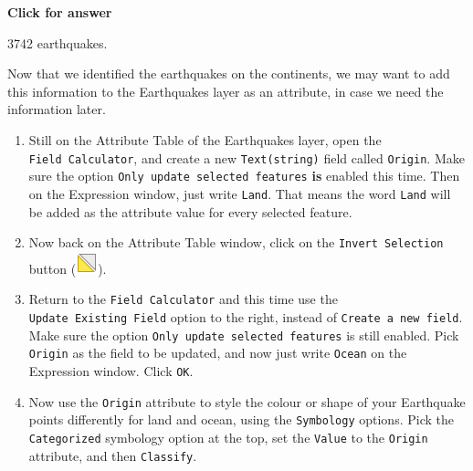 \documentclass[
  letterpaper,
  DIV=11,
  numbers=noendperiod]{scrreprt}
\begin{document}
\begin{tcolorbox}[enhanced jigsaw, toprule=.15mm, breakable, left=2mm, colframe=quarto-callout-important-color-frame, colback=white, arc=.35mm, leftrule=.75mm, opacityback=0, rightrule=.15mm, bottomrule=.15mm]

\vspace{-3mm}\textbf{Click for answer}\vspace{3mm}

3742 earthquakes.

\end{tcolorbox}

Now that we identified the earthquakes on the continents, we may want to
add this information to the Earthquakes layer as an attribute, in case
we need the information later.

\begin{enumerate}
\def\labelenumi{(\arabic{enumi})}
\setcounter{enumi}{106}
\item
  Still on the Attribute Table of the Earthquakes layer, open the
  \texttt{Field\ Calculator}, and create a new \texttt{Text(string)}
  field called \texttt{Origin}. Make sure the option
  \texttt{Only\ update\ selected\ features} \textbf{is} enabled this
  time. Then on the Expression window, just write
  \texttt{\textquotesingle{}Land\textquotesingle{}}. That means the word
  \texttt{Land} will be added as the attribute value for every selected
  feature.
\item
  Now back on the Attribute Table window, click on the
  \texttt{Invert\ Selection} button
  (\includegraphics{index_files/mediabag/mActionInvertSelecti.png}).
\item
  Return to the \texttt{Field\ Calculator} and this time use the
  \texttt{Update\ Existing\ Field} option to the right, instead of
  \texttt{Create\ a\ new\ field}. Make sure the option
  \texttt{Only\ update\ selected\ features} is still enabled. Pick
  \texttt{Origin} as the field to be updated, and now just write
  \texttt{\textquotesingle{}Ocean\textquotesingle{}} on the Expression
  window. Click \texttt{OK}.
\item
  Now use the \texttt{Origin} attribute to style the colour or shape of
  your Earthquake points differently for land and ocean, using the
  \texttt{Symbology} options. Pick the \texttt{Categorized} symbology
  option at the top, set the \texttt{Value} to the \texttt{Origin}
  attribute, and then \texttt{Classify}.
\end{enumerate}
\end{document}
